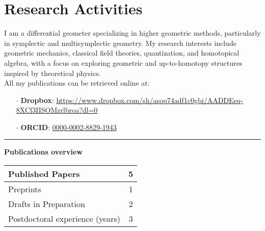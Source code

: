 \documentclass[a4paper]{article}
\newcommand{\block}[1]{\hrule \vspace{0.2cm} \textbf{\Large #1} \vspace{0.2cm}}
\newcommand{\txt}[1]{#1\\}
\begin{document}
	
	
	
	
	
	
	
	
	
	
	
	\clearpage
	\section*{Research Activities}

 
	\txt{I am a differential geometer specializing in higher geometric methods, particularly in symplectic and multisymplectic geometry. My research interests include geometric mechanics, classical field theories, quantization, and homotopical algebra, with a focus on exploring geometric and up-to-homotopy structures inspired by theoretical physics. }
	
	All my publications can be retrieved online at:
    \begin{itemize}[leftmargin=*, itemsep=0pt, parsep=0pt, topsep=0pt, partopsep=0pt]
		\item[$\cdot$] \textbf{Dropbox}: \url{https://www.dropbox.com/sh/asop74adf1c0gbi/AADDEeq-8XCf3IISOMzrlbroa?dl=0}
    		\item[$\cdot$] \textbf{ORCID}: \href{https://orcid.org/0000-0002-8829-1943}{0000-0002-8829-1943}
    \end{itemize}
    \vspace{1em}






    \block{Publications overview} 
    
    \begin{tabularx}{\linewidth}{|X|c|}
    \hline
    
    Published Papers & 5 \\
    \hline
    
    Preprints & 1 \\
    \hline
    
    Drafts in Preparation & 2 \\
    \hline
    
    Postdoctoral experience (years) & 3 \\
    \hline
    
    \end{tabularx}
    \vspace{1em}
\end{document}
